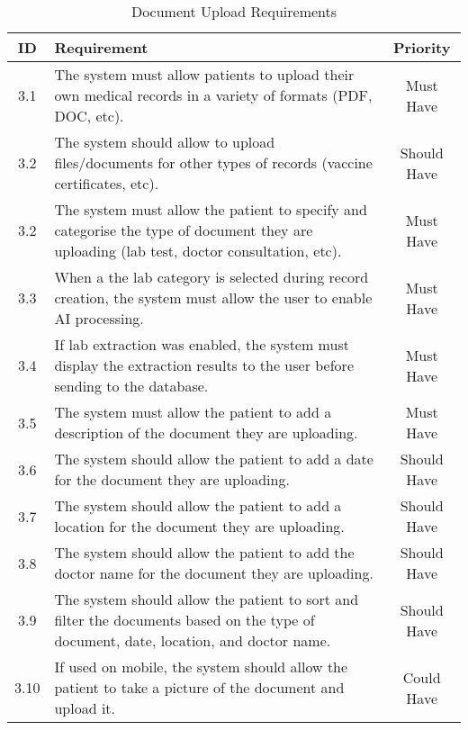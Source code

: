 \begin{table}[htbp]
    \centering
    \begin{tabular}{|c|p{10cm}|c|}
    \hline
    \textbf{ID}  & \textbf{Requirement}  & \textbf{Priority} \\ \hline
    3.1  & The system must allow patients to upload their own medical records in a variety of formats (PDF, DOC, etc). & Must Have \\ \hline
    3.2 & The system should allow to upload files/documents for other types of records (vaccine certificates, etc). & Should Have \\ \hline
    3.2  & The system must allow the patient to specify and categorise the type of document they are uploading (lab test, doctor consultation, etc). & Must Have \\ \hline
    3.3 & When a the lab category is selected during record creation, the system must allow the user to enable AI processing. & Must Have \\ \hline
    3.4 & If lab extraction was enabled, the system must display the extraction results to the user before sending to the database. & Must Have \\ \hline
    3.5 & The system must allow the patient to add a description of the document they are uploading. & Must Have \\ \hline
    3.6 & The system should allow the patient to add a date for the document they are uploading. & Should Have \\ \hline
    3.7 & The system should allow the patient to add a location for the document they are uploading. & Should Have \\ \hline
    3.8 & The system should allow the patient to add the doctor name for the document they are uploading. & Should Have \\ \hline
    3.9 & The system should allow the patient to sort and filter the documents based on the type of document, date, location, and doctor name. & Should Have \\ \hline
    3.10 & If used on mobile, the system should allow the patient to take a picture of the document and upload it. & Could Have \\ \hline
    \end{tabular}
    \caption{Document Upload Requirements}
\end{table}

